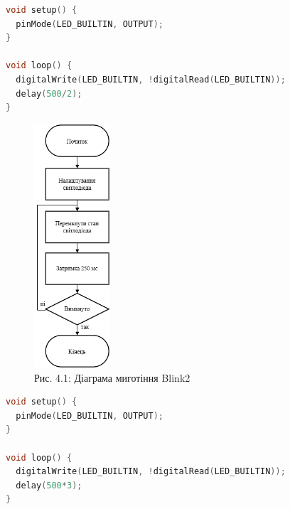 \documentclass[a4paper]{article}
\begin{document}
\begin{lstlisting}[language=C++, caption=Програма Blink2 - вбудований світлодіод миготить у 2 рази швидше]
void setup() {
  pinMode(LED_BUILTIN, OUTPUT);
}

void loop() {
  digitalWrite(LED_BUILTIN, !digitalRead(LED_BUILTIN));
  delay(500/2);
}
\end{lstlisting}


\begin{figure}[h]
    \centering
    \includegraphics[width=0.25\textwidth]{imgs/LW4.0.1.drawio.png}
    \caption*{Рис. 4.1: Діаграма миготіння Blink2}
\end{figure} 

\newpage

\begin{lstlisting}[language=C++, caption=Програма Blink3 - вбудований світлодіод миготить у 3 рази повільніше]
void setup() {
  pinMode(LED_BUILTIN, OUTPUT);
}

void loop() {
  digitalWrite(LED_BUILTIN, !digitalRead(LED_BUILTIN));
  delay(500*3);
}
\end{lstlisting}
\end{document}

